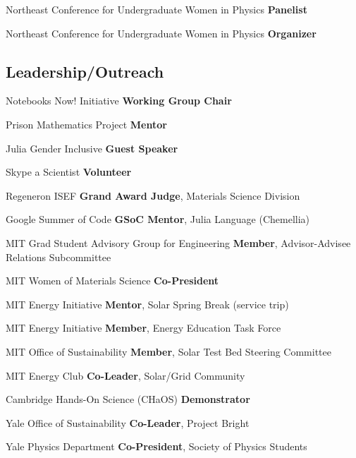 {Northeast Conference for Undergraduate Women in Physics}
{\textbf{Panelist}}
{}

{Northeast Conference for Undergraduate Women in Physics}
{\textbf{Organizer}}
{}

\subsection{Leadership/Outreach}

{Notebooks Now! Initiative}
{\textbf{Working Group Chair}}
{}

{Prison Mathematics Project}
{\textbf{Mentor}}
{}

{Julia Gender Inclusive}
{\textbf{Guest Speaker}}
{}

{Skype a Scientist}
{\textbf{Volunteer}}
{}

{Regeneron ISEF}
{\textbf{Grand Award Judge}, Materials Science Division}
{}

{Google Summer of Code}
{\textbf{GSoC Mentor}, Julia Language (Chemellia)}
{}

{MIT Grad Student Advisory Group for Engineering}
{\textbf{Member}, Advisor-Advisee Relations Subcommittee}
{}

{MIT Women of Materials Science}
{\textbf{Co-President}}
{}

{MIT Energy Initiative}
{\textbf{Mentor}, Solar Spring Break (service trip)}
{}

{MIT Energy Initiative}
{\textbf{Member}, Energy Education Task Force}
{}

{MIT Office of Sustainability}
{\textbf{Member}, Solar Test Bed Steering Committee}
{}

{MIT Energy Club}
{\textbf{Co-Leader}, Solar/Grid Community}
{}

{Cambridge Hands-On Science (CHaOS)}
{\textbf{Demonstrator}}
{}

{Yale Office of Sustainability}
{\textbf{Co-Leader}, Project Bright}
{}

{Yale Physics Department}
{\textbf{Co-President}, Society of Physics Students}
{}